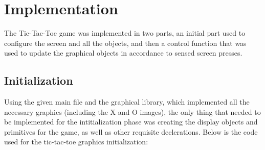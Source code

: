 \documentclass[12pt]{article}
\begin{document}
\section{Implementation}
The Tic-Tac-Toe game was implemented in two parts, an initial part used to configure the screen and all the objects, and then a control function that was used to update the graphical objects in accordance to sensed screen presses.
\subsection*{Initialization}
Using the given main file and the graphical library, which implemented all the necessary graphics (including the X and O images), the only thing that needed to be implemented for the intitialization phase was creating the display objects and primitives for the game, as well as other requisite declerations. Below is the code used for the tic-tac-toe graphics initialization:
\end{document}
